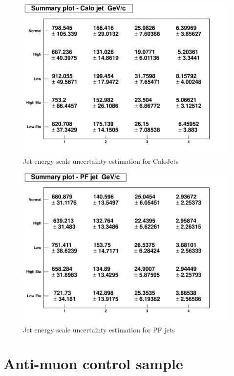 \documentclass{cmspaper2}
\begin{document}
\begin{figure}[hbtp]
\begin{center}
\includegraphics[width=150mm]{CaloJet_JES}
\caption{Jet energy scale uncertainty estimation for CaloJets}
\label{Figure_CaloJetJES}
\end{center}
\end{figure}

\begin{figure}[hbtp]
\begin{center}
\includegraphics[width=150mm]{PFJet_JES}
\caption{Jet energy scale uncertainty estimation for PF jets}
\label{Figure_PFJetJES}
\end{center}
\end{figure}


\section{Anti-muon control sample}
\end{document}
